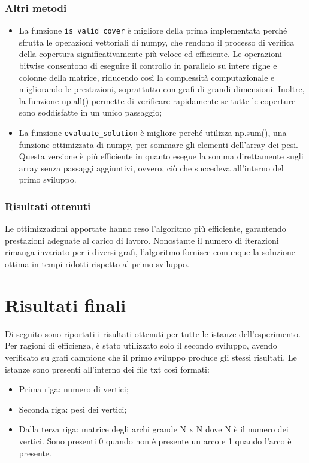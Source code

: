 \documentclass[12pt,a4paper,twoside]{article}
\begin{document}
\subsubsection{Altri metodi}
\begin{itemize}
    \item La funzione \texttt{is\_valid\_cover} è migliore della prima implementata perché sfrutta le operazioni vettoriali di numpy, che rendono il processo di verifica della copertura significativamente più veloce ed efficiente. Le operazioni bitwise consentono di eseguire il controllo in parallelo su intere righe e colonne della matrice, riducendo così la complessità computazionale e migliorando le prestazioni, soprattutto con grafi di grandi dimensioni. Inoltre, la funzione np.all() permette di verificare rapidamente se tutte le coperture sono soddisfatte in un unico passaggio;
    \item La funzione \texttt{evaluate\_solution} è migliore perché utilizza np.sum(), una funzione ottimizzata di numpy, per sommare gli elementi dell'array dei pesi. Questa versione è più efficiente in quanto esegue la somma direttamente sugli array senza passaggi aggiuntivi, ovvero, ciò che succedeva all'interno del primo sviluppo.
\end{itemize}
\subsubsection{Risultati ottenuti}
Le ottimizzazioni apportate hanno reso l'algoritmo più efficiente, garantendo prestazioni adeguate al carico di lavoro. Nonostante il numero di iterazioni rimanga invariato per i diversi grafi, l'algoritmo fornisce comunque la soluzione ottima in tempi ridotti rispetto al primo sviluppo.
\section{Risultati finali}
Di seguito sono riportati i risultati ottenuti per tutte le istanze dell'esperimento. Per ragioni di efficienza, è stato utilizzato solo il secondo sviluppo, avendo verificato su grafi campione che il primo sviluppo produce gli stessi risultati. Le istanze sono presenti all'interno dei file txt così formati:
\begin{itemize}
    \item Prima riga: numero di vertici;
    \item Seconda riga: pesi dei vertici;
    \item Dalla terza riga: matrice degli archi grande N x N dove N è il numero dei vertici. Sono presenti 0 quando non è presente un arco e 1 quando l'arco è presente.
\end{itemize}
\end{document}

